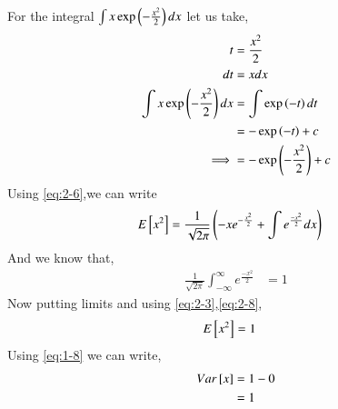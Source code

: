 \documentclass[journal,12pt,twocolumn]{IEEEtran}
\renewcommand\thesection{\arabic{section}}
\begin{document}
\begin{enumerate}[label=\thesection.\arabic*
,ref=\thesection.\theenumi]
\begin{align}
  \end{align}
For the integral $\int x\exp\left(-\frac{x^2}{2}\right)dx$ let us take,
  \begin{align}
	   t &= \frac{x^2}{2}\\
	  dt &= xdx\\
	  \int x\exp\left(-\frac{x^2}{2}\right)dx &= \int\exp\left(-t\right)dt\\
					                    &=  -\exp\left(-t\right) + c \\
				 \implies  &= -\exp\left(-\frac{x^{2}}{2}\right) + c \label{eq:2-6}
  \end{align}
 Using \eqref{eq:2-6},we can write
  \begin{align}
	  E{}\left[x^{2}\right] &= \frac{1}{\sqrt{2\pi}}\left( -xe^{-\frac{x^{2}}{2}} + \int e^{\frac{-x^{2}}{2}}dx\right)
  \end{align}
  And we know that,
  \begin{align}
	  \frac{1}{\sqrt{2\pi}}\int_{-\infty}^{\infty}e^{\frac{-x^{2}}{2}} &= 1 \label{eq:2-8}
  \end{align}
 Now putting limits and using \eqref{eq:2-3},\eqref{eq:2-8},
  \begin{align}
     E{}\left[x^{2}\right] &= 1
  \end{align}	  
Using \eqref{eq:1-8} we can write,
   \begin{align}
    Var{}\left[x\right] &= 1 - 0\\
	         &= 1
   \end{align}                           
%
\end{enumerate}
\end{document}
